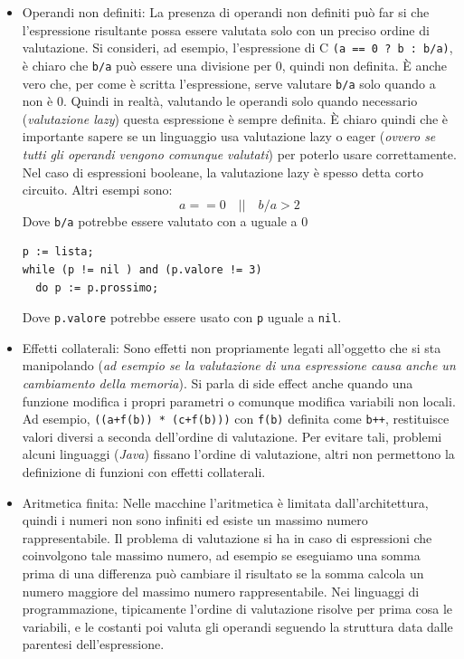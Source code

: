 \documentclass[oneside,a4paper,11pt]{book}
\theoremstyle{italicstyle}
\theoremstyle{normStyle}
\begin{document}
\begin{itemize}
  \item Operandi non definiti: La presenza di operandi non definiti può far si
  che l’espressione risultante possa essere valutata solo con un preciso
  ordine di valutazione. Si consideri, ad esempio, l’espressione di
  C \verb|(a == 0 ? b : b/a)|, è chiaro che \verb|b/a| può essere una
  divisione per 0, quindi non definita. È anche vero che, per come
  è scritta l’espressione, serve valutare \verb|b/a| solo quando a non è 0.
  Quindi in realtà, valutando le operandi solo quando necessario
  (\textit{valutazione lazy}) questa espressione è sempre definita.
  È chiaro quindi che è importante sapere se un linguaggio usa
  valutazione lazy o eager (\textit{ovvero se tutti gli operandi vengono
  comunque valutati}) per poterlo usare correttamente.
  Nel caso di espressioni booleane, la valutazione lazy è spesso
  detta corto circuito. Altri esempi sono:
  \[
    a == 0\quad || \quad b/a > 2
  \]
  Dove \verb|b/a| potrebbe essere valutato con a uguale a $0$
  \begin{lstlisting}
p := lista;
while (p != nil ) and (p.valore != 3)
  do p := p.prossimo;
  \end{lstlisting}
  Dove \verb|p.valore| potrebbe essere usato con \verb|p| uguale a \verb|nil|. 
  \item Effetti collaterali: Sono effetti non propriamente legati
  all’oggetto che si sta manipolando (\textit{ad esempio se la valutazione
  di una espressione causa anche un cambiamento della memoria}). Si
  parla di side effect anche quando una funzione modifica i propri
  parametri o comunque modifica variabili non locali. Ad esempio,
  \verb|((a+f(b)) * (c+f(b)))| con \verb|f(b)| definita come \verb|b++|,
  restituisce valori diversi a seconda dell’ordine di valutazione.
  Per evitare tali, problemi alcuni linguaggi (\textit{Java}) fissano l’ordine
  di valutazione, altri non permettono la definizione di funzioni
  con effetti collaterali. 
  \item Aritmetica finita: Nelle macchine l’aritmetica è limitata
  dall'architettura, quindi i numeri non sono infiniti ed esiste
  un massimo numero rappresentabile. Il problema di valutazione si
  ha in caso di espressioni che coinvolgono tale massimo numero, ad
  esempio se eseguiamo una somma prima di una differenza può cambiare
  il risultato se la somma calcola un numero maggiore del massimo
  numero rappresentabile. Nei linguaggi di programmazione, tipicamente
  l’ordine di valutazione risolve per prima cosa le variabili, e le
  costanti poi valuta gli operandi seguendo la struttura data dalle
  parentesi dell’espressione.
\end{itemize}
\end{document}
